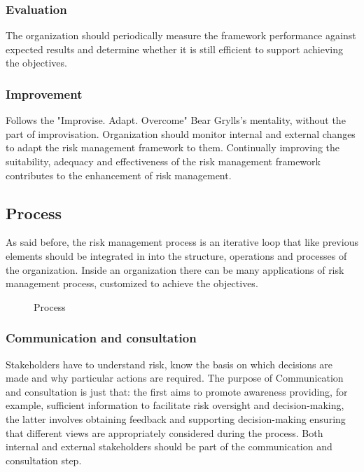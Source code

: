 \subsubsection{Evaluation}
The organization should periodically measure the framework performance against expected results and determine whether it is still efficient to support achieving the objectives.
\subsubsection{Improvement}
Follows the "Improvise. Adapt. Overcome" Bear Grylls's mentality, without the part of improvisation. Organization should monitor internal and external changes to adapt the risk management framework to them. Continually improving the suitability, adequacy and effectiveness of the risk management framework contributes to the enhancement of risk management.
\subsection{Process}
As said before, the risk management process is an iterative loop that like previous elements should be integrated in into the structure, operations and processes of the organization. Inside an organization there can be many applications of risk management process, customized to achieve the objectives.
\begin{figure}[H]
  \centering
  
  \caption{Process}
\end{figure}
\noindent
\subsubsection{Communication and consultation}
Stakeholders have to understand risk, know the basis on which decisions are made and why particular actions are required. The purpose of Communication and consultation is just that: the first aims to promote awareness providing, for example, sufficient information to facilitate risk oversight and decision-making, the latter involves obtaining feedback and supporting decision-making ensuring that different views are appropriately considered during the process. Both internal and external stakeholders should be part of the communication and consultation step.
